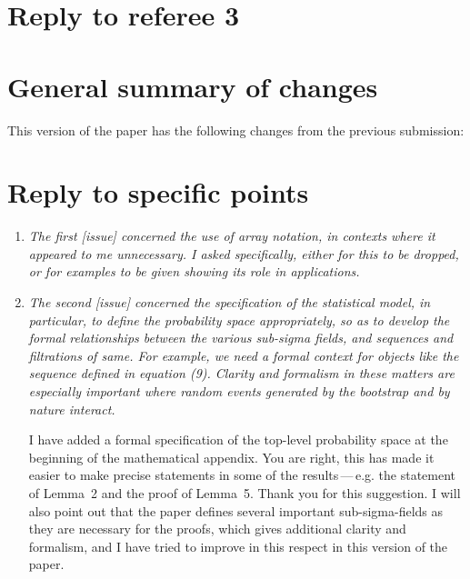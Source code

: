 \documentclass[12pt]{article}
\begin{document}
\section*{\hfill Reply to referee 3\hfill}
\section*{General summary of changes}
This version of the paper has the following changes from the
previous submission:


\section*{Reply to specific points}

\begin{enumerate}
\item \textit{The first [issue] concerned the use of array notation,
    in contexts where it appeared to me unnecessary. I asked
    specifically, either for this to be dropped, or for examples to be
    given showing its role in applications.}

\item \textit{The second [issue] concerned the specification of the
    statistical model, in particular, to define the probability space
    appropriately, so as to develop the formal relationships between
    the various sub-sigma fields, and sequences and filtrations of
    same. For example, we need a formal context for objects like the
    sequence defined in equation (9). Clarity and formalism in these
    matters are especially important where random events generated by
    the bootstrap and by nature interact.}

  I have added a formal specification of the top-level probability
  space at the beginning of the mathematical appendix. You are
  right, this has made it easier to make precise statements in some
  of the results\,---\,e.g. the statement of Lemma~2 and the proof
  of Lemma~5. Thank you for this suggestion.  I will also point out
  that the paper defines several important sub-sigma-fields as they
  are necessary for the proofs, which gives additional clarity and
  formalism, and I have tried to improve in this respect in this
  version of the paper.

\end{enumerate}
\end{document}
